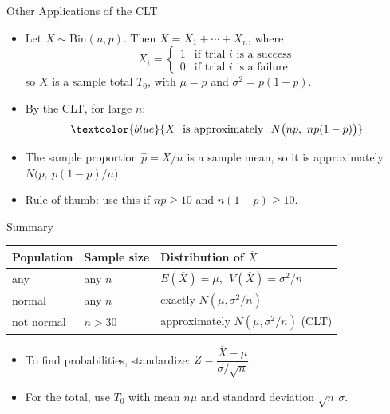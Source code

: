 \documentclass[12pt]{beamer}
\newcommand{\Xbar}{\overline{X}}
\begin{document}
\begin{frame}[t]{Other Applications of the CLT}
\begin{itemize}
\item Let $X\sim \text{Bin}(n,p)$. Then $X=X_1+\cdots+X_n$, where
\[
X_i=\begin{cases}1 & \text{if trial } i \text{ is a success}\\ 0 & \text{if trial } i \text{ is a failure}\end{cases}
\]
  so $X$ is a sample total $T_0$, with $\mu=p$ and $\sigma^2=p(1-p)$.
\item By the CLT, for large $n$:
\[
\textcolor{blue}{X\ \text{ is approximately }\ N\big(np,\ np(1-p)\big)}
\]
\item The sample proportion $\hat{p}=X/n$ is a sample mean, so it is approximately
  $N\big(p,\ p(1-p)/n\big)$.
\item Rule of thumb: use this if $np\ge 10$ and $n(1-p)\ge 10$.
\end{itemize}
\end{frame}

\begin{frame}[t]{Summary}
\begin{center}\small
\renewcommand{\arraystretch}{1.4}
\begin{tabular}{lll}
\toprule
Population & Sample size & Distribution of $\Xbar$ \\
\midrule
any        & any $n$     & $E(\Xbar)=\mu,\ \ V(\Xbar)=\sigma^2/n$ \\
normal     & any $n$     & exactly $N(\mu,\sigma^2/n)$ \\
not normal & $n>30$      & approximately $N(\mu,\sigma^2/n)$ (CLT) \\
\bottomrule
\end{tabular}
\end{center}
\vspace{0.3cm}
\begin{itemize}
\item To find probabilities, standardize: $Z=\dfrac{\Xbar-\mu}{\sigma/\sqrt{n}}$.
\item For the total, use $T_0$ with mean $n\mu$ and standard deviation $\sqrt{n}\,\sigma$.
\end{itemize}
\end{frame}
\end{document}
